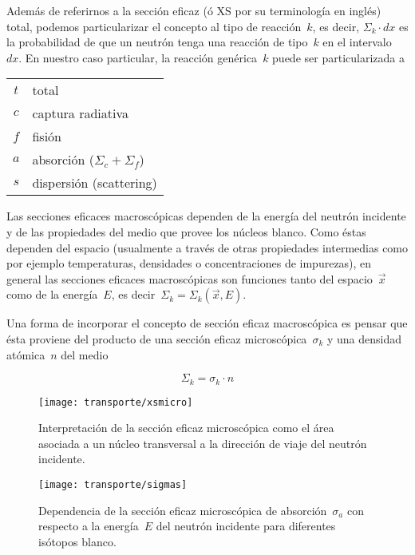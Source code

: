 Además de referirnos a la sección eficaz (ó XS por su terminología en inglés) total, podemos particularizar el concepto al tipo de reacción~$k$, es decir, \label{def:sigmak}$\Sigma_k \cdot dx$ es la probabilidad de que un neutrón tenga una reacción de tipo~$k$ en el intervalo~$dx$. En nuestro caso particular, la reacción genérica~$k$ puede ser particularizada a

\medskip

\begin{tabular}{cl}
 $t$ & total \\
 $c$ & captura radiativa \\
 $f$ & fisión \\
 $a$ & absorción ($\Sigma_c + \Sigma_f$) \\
 $s$ & dispersión (scattering)
\end{tabular}

\medskip

Las secciones eficaces macroscópicas dependen de la energía del neutrón incidente y de las propiedades del medio que provee los núcleos blanco. Como éstas dependen del espacio (usualmente a través de otras propiedades intermedias como por ejemplo temperaturas, densidades o concentraciones de impurezas), en general las secciones eficaces macroscópicas son funciones tanto del espacio~$\vec{x}$ como de la energía~$E$, es decir~$\Sigma_k = \Sigma_k(\vec{x}, E)$.

Una forma de incorporar el concepto de sección eficaz macroscópica es pensar que ésta proviene del producto de una sección eficaz microscópica~$\sigma_k$ y una densidad atómica~$n$ del medio

\begin{equation*}
 \Sigma_k = \sigma_k \cdot n
\end{equation*}


\begin{figure}[p]
 \begin{center}
  \texttt{[image: transporte/xsmicro]}
 \end{center}
\caption{\label{fig:xsmicro}Interpretación de la sección eficaz microscópica como el área asociada a un núcleo transversal a la dirección de viaje del neutrón incidente.}
\end{figure}

\begin{figure}[p]
 \begin{center}
  \texttt{[image: transporte/sigmas]}
 \end{center}
\caption{\label{fig:sigmas}Dependencia de la sección eficaz microscópica de absorción~$\sigma_a$ con respecto a la energía~$E$ del neutrón incidente para diferentes isótopos blanco.}
\end{figure}

